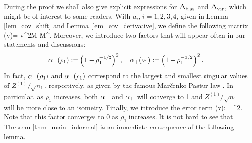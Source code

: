During the proof we shall also give explicit expressions for $\Delta_{\text{bias}}$ and $\Delta_{\text{var}}$, which might be of interest to some readers.
With $a_i$, $i=1,2,3,4$, given in Lemma \ref{lem_cov_shift} and Lemma \ref{lem_cov_derivative},
we define the following matrix
\be\label{defnpihat}\Pi \equiv \Pi(\hat v)= \cdot \hat v^2{M}  {M}^{\top}.\ee
Moreover, we introduce two factors that will appear often in our statements and discussions:
$$\alpha_-(\rho_1):=\left(1- \rho_1^{-1/2}\right)^2,\quad \alpha_+(\rho_1):=\left(1 + \rho_1^{-1/2}\right)^2.$$
In fact, $\alpha_-(\rho_1)$ and $\alpha_+(\rho_1)$ correspond to the largest and smallest singular values of $Z^{(1)}/\sqrt{n_1}$, respectively, as given by the famous Mar{\v c}enko-Pastur law \cite{MP}. In particular, as $\rho_1$ increases, both $\alpha_-$ and $\alpha_+$ will converge to 1 and $Z^{(1)}/\sqrt{n_1}$ will be more close to an isometry. Finally, we introduce the error term
\be\label{eq_deltaextra}
 \delta(\hat v):= \cdot  {}^2.\ee
Note that this factor converges to 0 as $\rho_1$ increases. It is not hard to see that Theorem \ref{thm_main_informal} is an immediate consequence of the following lemma.






